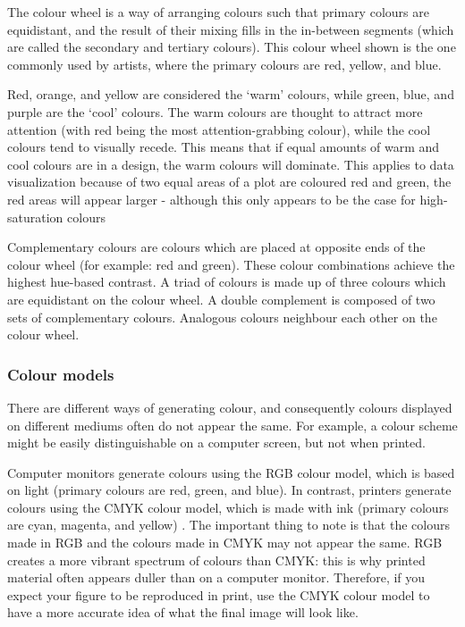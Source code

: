 \documentclass[letterpaper]{report}\usepackage[]{graphicx}\usepackage[]{color}
\begin{document}
The colour wheel is a way of arranging colours such that primary colours are equidistant, and the result of their mixing fills in the in-between segments (which are called the secondary and tertiary colours). This colour wheel shown is the one commonly used by artists, where the primary colours are red, yellow, and blue. 

Red, orange, and yellow are considered the `warm' colours, while green, blue, and purple are the `cool' colours. The warm colours are thought to attract more attention (with red being the most attention-grabbing colour), while the cool colours tend to visually recede. This means that if equal amounts of warm and cool colours are in a design, the warm colours will dominate. This applies to data visualization because of two equal areas of a plot are coloured red and green, the red areas will appear larger \cite{tedford} - although this only appears to be the case for high-saturation colours \cite{cleveland-colour-illusion}

Complementary colours are colours which are placed at opposite ends of the colour wheel (for example: red and green). These colour combinations achieve the highest hue-based contrast. A triad of colours is made up of three colours which are equidistant on the colour wheel. A double complement is composed of two sets of complementary colours. Analogous colours neighbour each other on the colour wheel. 

\subsubsection{Colour models}
There are different ways of generating colour, and consequently colours displayed on different mediums often do not appear the same. For example, a colour scheme might be easily distinguishable on a computer screen, but not when printed. 

Computer monitors generate colours using the RGB colour model, which is based on light (primary colours are red, green, and blue). In contrast, printers generate colours using the CMYK colour model, which is made with ink (primary colours are cyan, magenta, and yellow) \cite{silva}. The important thing to note is that the colours made in RGB and the colours made in CMYK may not appear the same. RGB creates a more vibrant spectrum of colours than CMYK: this is why printed material often appears duller than on a computer monitor. Therefore, if you expect your figure to be reproduced in print, use the CMYK colour model to have a more accurate idea of what the final image will look like.
\end{document}
